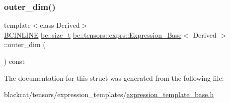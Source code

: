 \subsubsection{\texorpdfstring{outer\+\_\+dim()}{outer\_dim()}}
{\footnotesize\ttfamily template$<$class Derived$>$ \\
\hyperlink{common_8h_a6699e8b0449da5c0fafb878e59c1d4b1}{B\+C\+I\+N\+L\+I\+NE} \hyperlink{namespacebc_aaf8e3fbf99b04b1b57c4f80c6f55d3c5}{bc\+::size\+\_\+t} \hyperlink{structbc_1_1tensors_1_1exprs_1_1Expression__Base}{bc\+::tensors\+::exprs\+::\+Expression\+\_\+\+Base}$<$ Derived $>$\+::outer\+\_\+dim (\begin{DoxyParamCaption}{ }\end{DoxyParamCaption}) const\hspace{0.3cm}{\ttfamily [inline]}}



The documentation for this struct was generated from the following file\+:\begin{DoxyCompactItemize}
\item 
blackcat/tensors/expression\+\_\+templates/\hyperlink{expression__template__base_8h}{expression\+\_\+template\+\_\+base.\+h}\end{DoxyCompactItemize}
